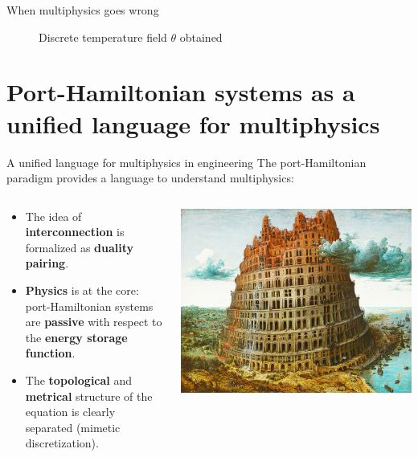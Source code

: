 \documentclass[aspectratio=169]{beamer}
\begin{document}
\begin{frame}{When multiphysics goes wrong}
\begin{figure}[t]
\begin{subfigure}[t]{0.32\textwidth}
	\end{subfigure}
\caption{Discrete temperature field $\theta$ obtained }
\end{figure}

\end{frame}

\section{Port-Hamiltonian systems as a unified language for multiphysics}

\begin{frame}{A unified language for multiphysics in engineering}
	The port-Hamiltonian paradigm provides a language to understand multiphysics:
	\vspace{.5cm}
	\begin{columns}
		\begin{column}{.6\textwidth}
			\begin{itemize}
				\item The idea of \textbf{interconnection} is formalized as \textbf{duality pairing}.
				\item \textbf{Physics} is at the core: port-Hamiltonian systems are \textbf{passive} with respect to the \textbf{energy storage function}.
				\item The \textbf{topological} and \textbf{metrical} structure of the equation is clearly separated (mimetic discretization).
			\end{itemize}
		\end{column}
		\begin{column}{.4\textwidth}
			\centering
			\includegraphics[width=.9\columnwidth]{babel_tower.jpeg}
		\end{column}
	\end{columns}

\end{frame}
\end{document}
